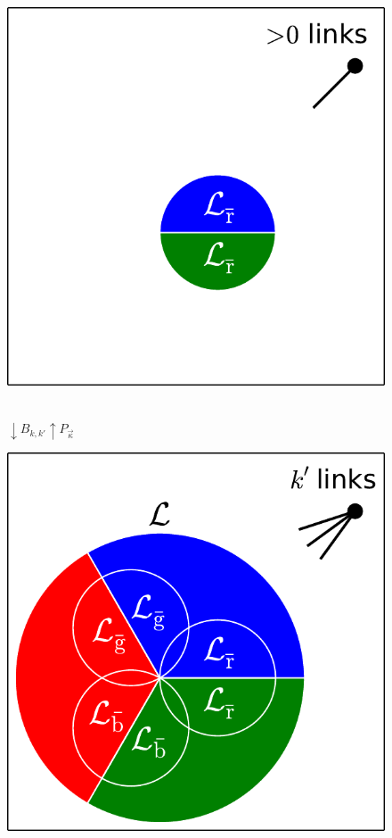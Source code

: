 \documentclass[aps, pre, onecolumn, a4paper, floatfix]{revtex4}
\begin{document}
\begin{figure}[htb]
\begin{minipage}[b]{0.54\linewidth}
\begin{center}
     \hspace{-1mm}
    \includegraphics[trim=100 0 0 0,clip,height=0.4\columnwidth]{sets_k_gc_no_1.pdf}
   \end{center}
  \end{minipage}\\
     \vspace{2mm}
      {\large \hspace{-30mm} $\downarrow B_{k,k'}$\hspace{90mm}$\uparrow P_{\vec \kappa}$ }\\
     \vspace{2mm}
  \begin{minipage}[b]{0.22\linewidth}
    \begin{center}
    \includegraphics[width=0.99\columnwidth]{sets_k_gc.pdf}
   \end{center}

\end{minipage}
\end{figure}
\end{document}
